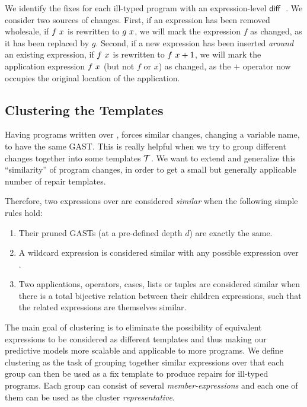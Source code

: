 We identify the fixes for each ill-typed program with an expression-level
$\mathsf{diff}$~\citep{Lempsink2009-xf}. We consider two sources of changes. First,
if an expression has been removed wholesale, \eg if $f\ x$ is rewritten
to $g\ x$, we will mark the expression $f$ as changed, as it has been
replaced by $g$. Second, if a new expression has been inserted \emph{around} an
existing expression, \eg if $f\ x$ is rewritten to
$f\ x + 1$, we will mark the application expression $f\ x$
(but not $f$ or $x$) as changed, as the $+$ operator now occupies the original
location of the application.



\subsection{Clustering the Templates}
\label{subsec:clustering}

Having programs written over \repairLang, forces similar changes, \ie changing a
variable name, to have the same GAST. This is really helpful when we try to
group different changes together into some templates $\mathcal{T}$. We want to extend and
generalize this ``similarity'' of program changes, in order to get a small but
generally applicable number of repair templates.

Therefore, two expressions over \repairLang are considered \emph{similar} when
the following simple rules hold:
\begin{enumerate}
    \item Their pruned GASTs (at a pre-defined depth $d$) are exactly the same.
    \item A wildcard expression is considered similar with any possible
    expression over \repairLang.
    \item Two applications, operators, cases, lists or tuples are considered
    similar when there is a total bijective relation between their children
    expressions, such that the related expressions are themselves similar.
\end{enumerate}


The main goal of clustering is to eliminate the possibility of equivalent
expressions to be considered as different templates and thus making our
predictive models more scalable and applicable to more programs. We define
clustering as the task of grouping together similar expressions over \repairLang
that each group can then be used as a fix template to produce repairs for
ill-typed programs. Each group can consist of several \emph{member-expressions}
and each one of them can be used as the cluster \emph{representative}.

